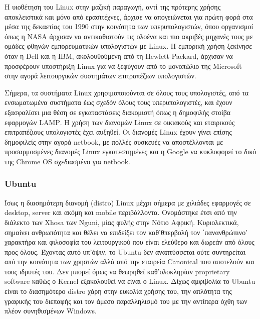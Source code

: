 \documentclass[a4paper, 11pt]{article}
\begin{document}
{Η υιοθέτηση του \textlatin{Linux} στην μαζική παραγωγή, αντί της πρότερης χρήσης αποκλειστικά και μόνο από ερασιτέχνες, άρχισε να απογειώνεται για πρώτη φορά στα μέσα της δεκαετίας του 1990 στην κοινότητα των υπερυπολογιστών, όπου οργανισμοί όπως η \textlatin{NASA} άρχισαν να αντικαθιστούν τις ολοένα και πιο ακριβές μηχανές τους με ομάδες φθηνών εμπορευματικών υπολογιστών με \textlatin{Linux}. Η εμπορική χρήση ξεκίνησε όταν η \textlatin{Dell} και η \textlatin{IBM}, ακολουθούμενη από τη \textlatin{Hewlett-Packard}, άρχισαν να προσφέρουν υποστήριξη \textlatin{Linux} για να ξεφύγουν από το μονοπώλιο της \textlatin{Microsoft} στην αγορά λειτουργικών συστημάτων επιτραπέζιων υπολογιστών.

Σήμερα, τα συστήματα \textlatin{Linux} χρησιμοποιούνται σε όλους τους υπολογιστές, από τα ενσωματωμένα συστήματα έως σχεδόν όλους τους υπερυπολογιστές, και έχουν εξασφαλίσει μια θέση σε εγκαταστάσεις διακομιστή όπως η δημοφιλής στοίβα εφαρμογών \textlatin{LAMP}. Η χρήση των διανομών \textlatin{Linux} σε οικιακούς και εταιρικούς επιτραπέζιους υπολογιστές έχει αυξηθεί. Οι διανομές \textlatin{Linux} έχουν γίνει επίσης δημοφιλείς στην αγορά netbook, με πολλές συσκευές να αποστέλλονται με προσαρμοσμένες διανομές \textlatin{Linux} εγκατεστημένες και η \textlatin{Google} να κυκλοφορεί το δικό της \textlatin{Chrome OS} σχεδιασμένο για \textlatin{netbook}. 


\subsubsection{\textlatin{Ubuntu}}
Ίσως η διασημότερη διανομή  \textlatin{(distro) Linux} μέχρι σήμερα με χιλιάδες εφαρμογές σε  \textlatin{desktop},  \textlatin{server} και ακόμη και  \textlatin{mobile} περιβάλλοντα. Ονομάστηκε έτσι από την διάλεκτο των  \textlatin{Xhosa} των  \textlatin{Nguni}, μίας φυλής στην Νότιο Αφρική. Κυριολεκτικά, σημαίνει ανθρωπότητα και θέλει να επιδείξει τον καθ'θπερβολή τον ΄πανανθρώπινο' χαρακτήρα και φιλοσοφία του λειτουργικού που είναι ελεύθερο και δωρεάν από όλους προς όλους. Έχοντας αυτό υπ'όψιν, το  \textlatin{Ubuntu} δεν αναπτύσσεται ούτε συντηρείται από την κοινότητα των χρηστών αλλά από την εταιρεία  \textlatin{Canonical} που αποτελούν και τους ιδρυτές του. Δεν μπορεί όμως να θεωρηθεί καθ'ολοκληρίαν  \textlatin{proprietary software} καθώς ο  \textlatin{Kernel} εξακολουθεί να είναι ο  \textlatin{Linux}. Δίχως αμφιβολία το  \textlatin{Ubuntu} είναι το διασημότερο  \textlatin{distro} χάρη στην ευκολία χρήσης του, την απλότητα της γραφικής του διεπαφής και τον άμεσο παραλληλισμό του με την αντίπερα όχθη των πλέον συνηθισμένων  \textlatin{Windows}.

}
\end{document}
